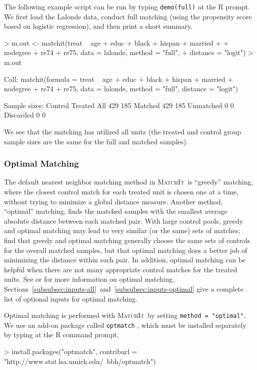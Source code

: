 \documentclass[oneside,letterpaper,titlepage]{article}
\newcommand{\MatchIt}{\textsc{MatchIt}}
\begin{document}
The following example script can be run by typing {\tt demo(full)} at
the R prompt.  We first load the Lalonde data, conduct full matching
(using the propensity score based on logistic regression), and then
print a short summary.
\begin{Schunk}
\begin{Sinput}
> m.out <- matchit(treat ~ age + educ + black + hispan + married + 
+     nodegree + re74 + re75, data = lalonde, method = "full", 
+     distance = "logit")
> m.out
\end{Sinput}
\begin{Soutput}
Call: 
matchit(formula = treat ~ age + educ + black + hispan + married + 
    nodegree + re74 + re75, data = lalonde, method = "full", 
    distance = "logit")

Sample sizes:
          Control Treated
All           429     185
Matched       429     185
Unmatched       0       0
Discarded       0       0
\end{Soutput}
\end{Schunk}
We see that the matching has utilized all units (the treated and
control group sample sizes are the same for the full and matched
samples). 

\subsubsection{Optimal Matching}
\label{subsubsec:optimal}

The default nearest neighbor matching method in \MatchIt\ is
``greedy'' matching, where the closest control match for each treated
unit is chosen one at a time, without trying to minimize a global
distance measure.  Another method, ``optimal'' matching, finds the
matched samples with the smallest average absolute distance between
each matched pair.  With large control pools, greedy and optimal
matching may lead to very similar (or the same) sets of matches;
\citet{GuRos93} find that greedy and optimal matching generally choose
the same sets of controls for the overall matched samples, but that
optimal matching does a better job of minimizing the distance within
each pair.  In addition, optimal matching can be helpful when there
are not many appropriate control matches for the treated units.  See
\cite{GuRos93} or \cite{Rosenbaum02} for more information on optimal
matching.
Sections~\ref{subsubsec:inputs-all}~and~\ref{subsubsec:inputs-optimal}
give a complete list of optional inputs for optimal matching.

Optimal matching is performed with \MatchIt\ by setting \texttt{method
  = "optimal"}.  We use an add-on package called \texttt{optmatch}
\citep{Hansen04}, which must be installed separately by typing at the
R command prompt,
\begin{Schunk}
\begin{Sinput}
> install.packages("optmatch", contriburl = "http://www.stat.lsa.umich.edu/~bbh/optmatch")
\end{Sinput}
\end{Schunk}
\end{document}
